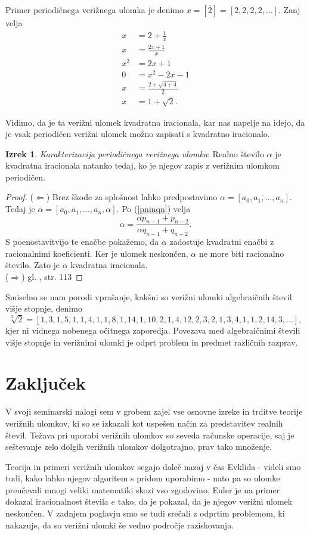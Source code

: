 \documentclass[a4paper,12pt]{article}
\theoremstyle{definition}
\theoremstyle{proposition}
\theoremstyle{theorem}
\newtheorem{iz}{Izrek}[section]
\theoremstyle{lemma}
\begin{document}
Primer periodičnega verižnega ulomka je denimo $x = [\overline{2}] =[2,2,2,2,...]$. Zanj velja
\begin{align*}
x&= 2 + \frac{1}{x} \\
x&= \frac{2x+1}{x} \\
x^2&= 2x+1 \\
0&=x^2-2x-1\\
x&=\frac{2+\sqrt{4+4}}{2}\\
x&=1+\sqrt{2}.
\end{align*}

Vidimo, da je ta verižni ulomek kvadratna iracionala, kar nas napelje na idejo, da je vsak periodičen verižni ulomek možno zapisati s kvadratno iracionalo.

\begin{iz}
\label{periodicni}
\textit{Karakterizacija periodičnega verižnega ulomka}: Realno število $\alpha$ je kvadratna iracionala natanko tedaj, ko je njegov zapis z verižnim ulomkom periodičen.
\end{iz}
\begin{proof}
($\Leftarrow$) Brez škode za splošnost lahko predpostavimo $\alpha = [\overline{a_0, a_1, ..., a_n}]$. Tedaj je $\alpha = [a_0, a_1, ..., a_n, \alpha]$. Po (\ref{pninqn}) velja \[ \alpha = \frac{\alpha p_{n-1} + p_{n-2}}{\alpha q_{n-1} + q_{n-2}}. \]
S poenostavitvijo te enačbe pokažemo, da $\alpha$ zadostuje kvadratni enačbi z racionalnimi koeficienti. Ker je ulomek neskončen, $\alpha$ ne more biti racionalno število. Zato je $\alpha$ kvadratna iracionala.\\
($\Rightarrow$) gl. \cite{teorijastevil}, str. 113
\end{proof}

Smiselno se nam porodi vprašanje, kakšni so verižni ulomki algebraičnih števil višje stopnje, denimo $$\sqrt[3]{2} =[1, 3, 1, 5, 1, 1, 4, 1, 1, 8, 1, 14, 1, 10, 2, 1, 4, 12, 2, 3, 2, 1, 3, 4, 1, 1, 2, 14,
3, ...],$$
kjer ni vidnega nobenega očitnega zaporedja. Povezava med algebraičnimi števili višje stopnje in verižnimi ulomki je odprt problem in predmet različnih razprav.
\newpage

\section{Zaključek}

V svoji seminarski nalogi sem v grobem zajel vse osnovne izreke in trditve teorije verižnih ulomkov, ki so se izkazali kot uspešen način za predstavitev realnih števil. Težava pri uporabi verižnih ulomkov so seveda računske operacije, saj je seštevanje zelo dolgih verižnih ulomkov dolgotrajno, prav tako množenje.\par
Teorija in primeri verižnih ulomkov segajo daleč nazaj v čas Evklida - videli smo tudi, kako lahko njegov algoritem s pridom uporabimo - nato pa so ulomke preučevali mnogi veliki matematiki skozi vso zgodovino. Euler je na primer dokazal iracionalnost števila $e$ tako, da je pokazal, da je njegov verižni ulomek neskončen. V zadnjem poglavju smo se tudi srečali z odprtim problemom, ki nakazuje, da so verižni ulomki še vedno področje raziskovanja.\par
\end{document}
